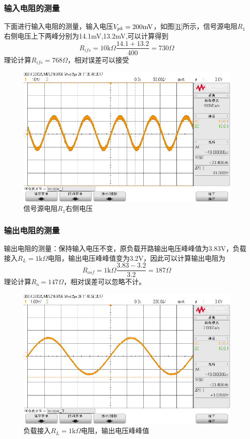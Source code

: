 \documentclass[UTF8,a4paper]{article}
\begin{document}
\subsubsection{输入电阻的测量}
下面进行输入电阻的测量，输入电压$V_{pk}=200\rm{mV}$，如图\ref{R}所示，信号源电阻$R_1$右侧电压上下两峰分别为14.1mV,13.2mV,可以计算得到
$$R_{ifs}=10\mathrm{k}\Omega\frac{14.1+13.2}{400}=730\Omega$$理论计算$R_{ifs}=768\Omega$，相对误差可以接受

\begin{figure}
\centering
\includegraphics[width=\textwidth]{scope_1.bmp}
\caption{信号源电阻$R_1$右侧电压}
\end{figure}

\subsubsection{输出电阻的测量}
输出电阻的测量：保持输入电压不变，原负载开路输出电压峰峰值为3.83V，负载接入$R_L=1\mathrm{k}\Omega$电阻，输出电压峰峰值变为3.2V，因此可以计算输出电阻为
$$R_{osf}=1\mathrm{k}\Omega\frac{3.83-3.2}{3.2}=187\Omega$$
理论计算$R_o=147\Omega$，相对误差可以忽略不计。

\begin{figure}
\centering
\includegraphics[width=\textwidth]{scope_3.bmp}
\caption{负载接入$R_L=1\mathrm{k}\Omega$电阻，输出电压峰峰值}
\end{figure}
\end{document}
